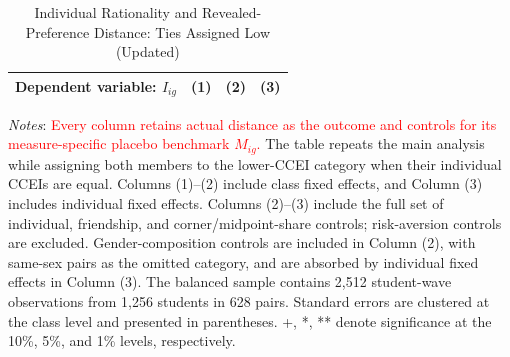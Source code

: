 \documentclass[11 pt]{article}
\begin{document}
\begin{table}[H]
\centering
\caption{Individual Rationality and Revealed-Preference Distance: Ties Assigned Low \mbox{(Updated)}}
\label{tab:pref_agg_ccei_bothlow}
\begin{tabular}{lccc}
\toprule \hline
Dependent variable: $I_{ig}$ & (1) & (2) & (3) \\ \midrule

\end{tabular}
\begin{minipage}{\textwidth}
{\footnotesize \emph{Notes}: \textcolor{red}{Every column retains actual distance as the outcome and controls for its measure-specific placebo benchmark $M_{ig}$.}  The table repeats the main analysis while assigning both members to the lower-CCEI category when their individual CCEIs are equal. Columns (1)--(2) include class fixed effects, and Column (3) includes individual fixed effects. Columns (2)--(3) include the full set of individual, friendship, and corner/midpoint-share controls; risk-aversion controls are excluded. Gender-composition controls are included in Column (2), with same-sex pairs as the omitted category, and are absorbed by individual fixed effects in Column (3). The balanced sample contains 2,512 student-wave observations from 1,256 students in 628 pairs. Standard errors are clustered at the class level and presented in parentheses. +, *, ** denote significance at the 10\%, 5\%, and 1\% levels, respectively.}
\end{minipage}
\end{table}
\end{document}
